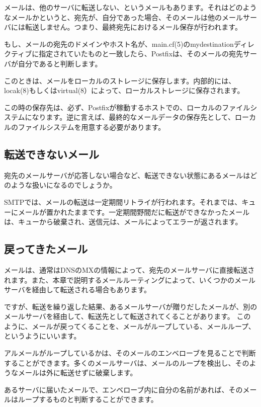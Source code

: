 メールは、他のサーバに転送しない、というメールもあります。それはどのようなメールかというと、宛先が、自分であった場合、そのメールは他のメールサーバには転送しません。つまり、最終宛先におけるメール保存が行われます。

もし、メールの宛先のドメインやホスト名が、main.cf(5)のmydestinationディレクティブに指定されていたものと一致したら、Postfixは、そのメールの宛先サーバが自分であると判断します。

このときは、メールをローカルのストレージに保存します。内部的には、locak(8)もしくはvirtual(8）によって、ローカルストレージに保存されます。

この時の保存先は、必ず、Postfixが稼動するホストでの、ローカルのファイルシステムになります。逆に言えば、最終的なメールデータの保存先として、ローカルのファイルシステムを用意する必要があります。

\subsection{転送できないメール}

宛先のメールサーバが応答しない場合など、転送できない状態にあるメールはどのような扱いになるのでしょうか。

SMTPでは、メールの転送は一定期間リトライが行われます。それまでは、キューにメールが置かれたままです。一定期間野間だに転送ができなかったメールは、キューから破棄され、送信元は、メールによってエラーが返されます。


\subsection{戻ってきたメール}

メールは、通常はDNSのMXの情報によって、宛先のメールサーバに直接転送されます。また、本章で説明するメールルーティングによって、いくつかのメールサーバを経由して転送される場合もあります。

ですが、転送を繰り返した結果、あるメールサーバが贈りだしたメールが、別のメールサーバを経由して、転送先として転送されてくることがあります。
このように、メールが戻ってくることを、メールがループしている、メールループ、というようにいいます。

アルメールがループしているかは、そのメールのエンベローブを見ることで判断することができます。多くのメールサーバは、メールのループを検出し、そのようなメールは外に転送せずに破棄します。

あるサーバに届いたメールで、エンベローブ内に自分の名前があれば、そのメールはループするものと判断することができます。

